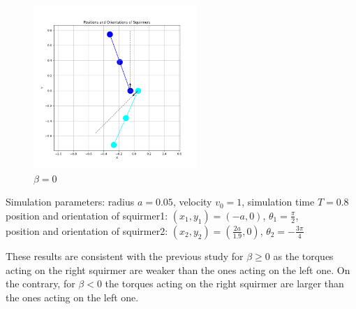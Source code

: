 \documentclass{article}
\begin{document}
\begin{figure}[H]
\begin{minipage}{0.49\textwidth}
        \caption{\footnotesize $\beta = 3$}
    \end{minipage}
    \includegraphics[width=0.55\textwidth]{graphs/simulations/sim_sq_sq/beta0/m3pi_4_.png}
    \caption{\footnotesize $\beta = 0$}
\end{figure}
\begin{center}
    Simulation parameters: radius $a=0.05$, velocity $v_0=1$, simulation time $T=0.8$\\
        position and orientation of squirmer1: $(x_1,y_1)=(-a,0)$, $\theta_1=\frac{\pi}{2}$,\\
        position and orientation of squirmer2: $(x_2,y_2)=(\frac{2a}{1.9},0)$, $\theta_2=-\frac{3\pi}{4}$
\end{center}
These results are consistent with the previous study\cite{Stark} for $\beta \ge 0$ as the torques acting on the right squirmer
are weaker than the ones acting on the left one. On the contrary, for $\beta < 0$ the torques acting on the right squirmer are larger
than the ones acting on the left one.
\end{document}
